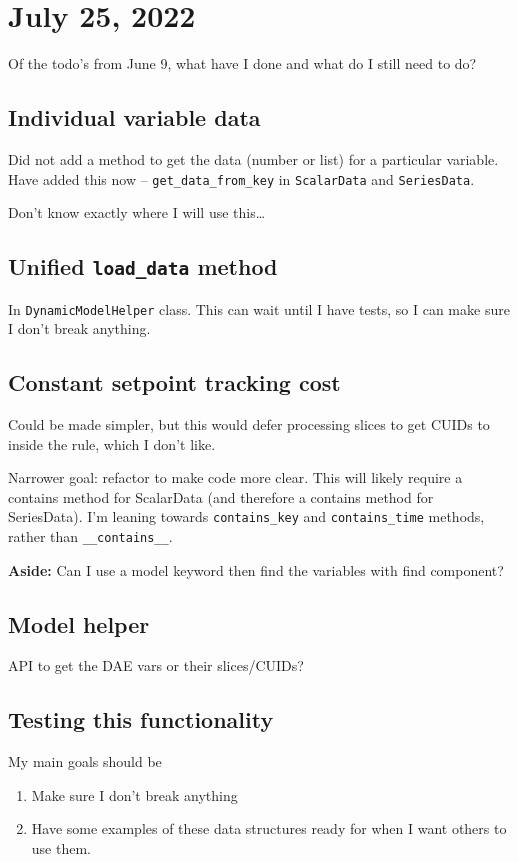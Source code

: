 \documentclass{article}
\begin{document}
\section{July 25, 2022}
Of the todo's from June 9, what have I done and what do I still need to do?

\subsection{Individual variable data}
Did not add a method to get the data (number or list) for a particular
variable. Have added this now -- \texttt{get\_data\_from\_key}
in \texttt{ScalarData} and \texttt{SeriesData}.

Don't know exactly where I will use this\ldots

\subsection{Unified \texttt{load\_data} method}
In \texttt{DynamicModelHelper} class. This can wait until I have tests,
so I can make sure I don't break anything.

\subsection{Constant setpoint tracking cost}
Could be made simpler, but this would defer processing slices to
get CUIDs to inside the rule, which I don't like.

Narrower goal: refactor to make code more clear.
This will likely require a contains method for ScalarData
(and therefore a contains method for SeriesData).
I'm leaning towards \texttt{contains\_key}
and \texttt{contains\_time} methods, rather than
\texttt{\_\_contains\_\_}.

\medskip

{\bf Aside:} Can I use a model keyword then find the variables
with find component?

\subsection{Model helper}
API to get the DAE vars or their slices/CUIDs?

\subsection{Testing this functionality}
My main goals should be
\begin{enumerate}
  \item Make sure I don't break anything
  \item Have some examples of these data structures ready for when I want
    others to use them.
\end{enumerate}
\end{document}
